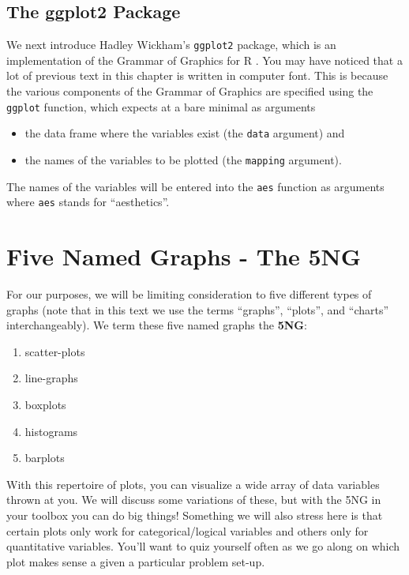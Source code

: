 \documentclass[]{tufte-book}
\providecommand{\tightlist}{%
  \setlength{\itemsep}{0pt}\setlength{\parskip}{0pt}}
\begin{document}
\subsection{The ggplot2 Package}\label{the-ggplot2-package}

We next introduce Hadley Wickham's \texttt{ggplot2} package, which is an
implementation of the Grammar of Graphics for R \citep{R-ggplot2}. You
may have noticed that a lot of previous text in this chapter is written
in computer font. This is because the various components of the Grammar
of Graphics are specified using the \texttt{ggplot} function, which
expects at a bare minimal as arguments

\begin{itemize}
\tightlist
\item
  the data frame where the variables exist (the \texttt{data} argument)
  and
\item
  the names of the variables to be plotted (the \texttt{mapping}
  argument).
\end{itemize}

The names of the variables will be entered into the \texttt{aes}
function as arguments where \texttt{aes} stands for ``aesthetics''.

\section{Five Named Graphs - The 5NG}\label{five-named-graphs---the-5ng}

For our purposes, we will be limiting consideration to five different
types of graphs (note that in this text we use the terms ``graphs'',
``plots'', and ``charts'' interchangeably). We term these five named
graphs the \textbf{5NG}:

\begin{enumerate}
\def\labelenumi{\arabic{enumi}.}
\tightlist
\item
  scatter-plots
\item
  line-graphs
\item
  boxplots
\item
  histograms
\item
  barplots
\end{enumerate}

With this repertoire of plots, you can visualize a wide array of data
variables thrown at you. We will discuss some variations of these, but
with the 5NG in your toolbox you can do big things! Something we will
also stress here is that certain plots only work for categorical/logical
variables and others only for quantitative variables. You'll want to
quiz yourself often as we go along on which plot makes sense a given a
particular problem set-up.
\end{document}
